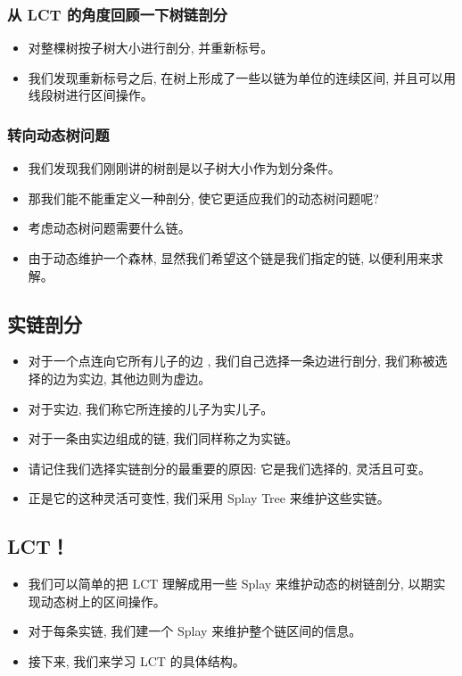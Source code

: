 \hr

\subsubsection{从 LCT 的角度回顾一下树链剖分}

\begin{itemize}
\item 对整棵树按子树⼤小进⾏剖分, 并重新标号。
\item 我们发现重新标号之后, 在树上形成了一些以链为单位的连续区间, 并且可以用线段树进⾏区间操作。
\end{itemize}

\subsubsection{转向动态树问题}

\begin{itemize}
\item 我们发现我们刚刚讲的树剖是以子树⼤小作为划分条件。
\item 那我们能不能重定义一种剖分, 使它更适应我们的动态树问题呢?
\item 考虑动态树问题需要什么链。
\item 由于动态维护⼀个森林, 显然我们希望这个链是我们指定的链, 以便利⽤来求解。
\end{itemize}

\subsection{实链剖分}

\begin{itemize}
\item 对于⼀个点连向它所有⼉子的边 , 我们⾃己选择⼀条边进行剖分, 我们称被选择的边为实边, 其他边则为虚边。
\item 对于实边, 我们称它所连接的⼉子为实⼉子。
\item 对于⼀条由实边组成的链, 我们同样称之为实链。
\item 请记住我们选择实链剖分的最重要的原因: 它是我们选择的, 灵活且可变。
\item 正是它的这种灵活可变性, 我们采用 Splay Tree 来维护这些实链。
\end{itemize}

\subsection{LCT！}

\begin{itemize}
\item 我们可以简单的把 LCT 理解成用⼀些 Splay 来维护动态的树链剖分, 以期实现动态树上的区间操作。
\item 对于每条实链, 我们建⼀个 Splay 来维护整个链区间的信息。 
\item 接下来, 我们来学习 LCT 的具体结构。
\end{itemize}

